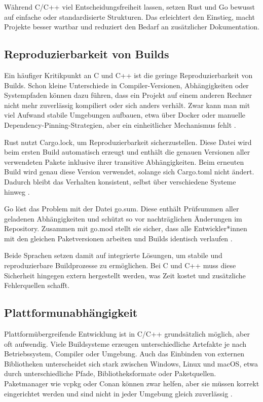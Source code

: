 Während C/C++ viel Entscheidungsfreiheit lassen, setzen Rust und Go bewusst auf einfache oder standardisierte Strukturen. 
Das erleichtert den Einstieg, macht Projekte besser wartbar und reduziert den Bedarf an zusätzlicher Dokumentation.

\subsection{Reproduzierbarkeit von Builds}
\label{subsec:Reproduzierbarkeit_von_Builds}

Ein häufiger Kritikpunkt an C und C++ ist die geringe Reproduzierbarkeit von Builds. 
Schon kleine Unterschiede in Compiler-Versionen, Abhängigkeiten oder Systempfaden können dazu führen, 
dass ein Projekt auf einem anderen Rechner nicht mehr zuverlässig kompiliert oder sich anders verhält. 
Zwar kann man mit viel Aufwand stabile Umgebungen aufbauen, etwa über Docker oder manuelle Dependency-Pinning-Strategien, 
aber ein einheitlicher Mechanismus fehlt \autocite{SurprisinglyComplexWorld}.

Rust nutzt Cargo.lock, um Reproduzierbarkeit sicherzustellen. Diese Datei wird beim ersten Build automatisch erzeugt 
und enthält die genauen Versionen aller verwendeten Pakete inklusive ihrer transitive Abhängigkeiten. 
Beim erneuten Build wird genau diese Version verwendet, solange sich Cargo.toml nicht ändert. 
Dadurch bleibt das Verhalten konsistent, selbst über verschiedene Systeme hinweg \autocite{HelloCargoRust}.

Go löst das Problem mit der Datei go.sum. Diese enthält Prüfsummen aller geladenen Abhängigkeiten und 
schützt so vor nachträglichen Änderungen im Repository. Zusammen mit go.mod stellt sie sicher, 
dass alle Entwickler*innen mit den gleichen Paketversionen arbeiten und Builds identisch verlaufen \autocite{ManagingDependenciesGo,UnderstandingGoModules}.

Beide Sprachen setzen damit auf integrierte Lösungen, um stabile und reproduzierbare Buildprozesse zu ermöglichen. 
Bei C und C++ muss diese Sicherheit hingegen extern hergestellt werden, was Zeit kostet und zusätzliche Fehlerquellen schafft.

\subsection{Plattformunabhängigkeit}
\label{subsec:Plattformunabhaengigkeit}

Plattformübergreifende Entwicklung ist in C/C++ grundsätzlich möglich, aber oft aufwendig. 
Viele Buildsysteme erzeugen unterschiedliche Artefakte je nach Betriebssystem, Compiler oder Umgebung. 
Auch das Einbinden von externen Bibliotheken unterscheidet sich stark zwischen Windows, Linux und macOS, 
etwa durch unterschiedliche Pfade, Bibliotheksformate oder Paketquellen. 
Paketmanager wie vcpkg oder Conan können zwar helfen, aber sie müssen korrekt eingerichtet werden 
und sind nicht in jeder Umgebung gleich zuverlässig \autocite{NotesPackageManagement,tangUnderstandingThirdpartyLibrary2022}.

